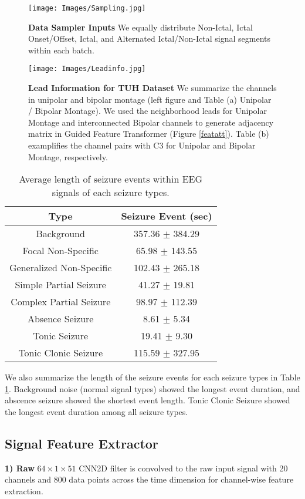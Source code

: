 \documentclass[pmlr,twocolumn,10pt]{jmlr}
\begin{document}
\begin{figure}[h!]
	\centering
	\texttt{[image: Images/Sampling.jpg]}
    \caption{\small \textbf{Data Sampler Inputs} We equally distribute Non-Ictal, Ictal Onset/Offset, Ictal, and Alternated Ictal/Non-Ictal signal segments within each batch.}
	\label{sampling}
\end{figure} 
\begin{figure*}[h!]
	\centering
	\texttt{[image: Images/Leadinfo.jpg]}
    \caption{\small \textbf{Lead Information for TUH Dataset} We summarize the channels in unipolar and bipolar montage (left figure and Table (a) Unipolar / Bipolar Montage). We used the neighborhood leads for Unipolar Montage and interconnected Bipolar channels to generate adjacency matrix in Guided Feature Transformer (Figure \ref{featatt}). Table (b) examplifies the channel pairs with C3 for Unipolar and Bipolar Montage, respectively.}
	\label{leadinfo}
\end{figure*} \begin{table}[h!]
    \footnotesize
	\centering
	\caption{Average length of seizure events within EEG signals of each seizure types.}
	\label{length}
	\begin{tabular}{c|c}
		\toprule
		Type & Seizure Event (sec) \\
		\midrule
		Background & 357.36 $\pm$ 384.29\\
		Focal Non-Specific & 65.98 $\pm$ 143.55\\
		Generalized Non-Specific & 102.43 $\pm$ 265.18\\
		Simple Partial Seizure & 41.27 $\pm$ 19.81\\
		Complex Partial Seizure & 98.97 $\pm$ 112.39\\
		Absence Seizure & 8.61 $\pm$ 5.34\\
		Tonic Seizure & 19.41 $\pm$ 9.30\\
		Tonic Clonic Seizure & 115.59 $\pm$ 327.95\\
		\bottomrule
	\end{tabular}
\end{table} We also summarize the length of the seizure events for each seizure types in Table \ref{length}. Background noise (normal signal types) showed the longest event duration, and abscence seizure showed the shortest event length. Tonic Clonic Seizure showed the longest event duration among all seizure types.

\subsection{Signal Feature Extractor}
\label{sec: featextractor}
\textbf{1) Raw}
$64 \times 1 \times 51$ CNN2D filter is convolved to the raw input signal with 20 channels and 800 data points across the time dimension for channel-wise feature extraction.
\end{document}

